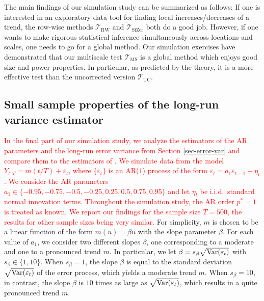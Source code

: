 The main findings of our simulation study can be summarized as follows: If one is interested in an exploratory data tool for finding local increases/decreases of a trend, the row-wise methods $\mathcal{T}_{\text{RW}}$ and $\mathcal{T}_{\text{SiZer}}$ both do a good job. However, if one wants to make rigorous statistical inference simultaneously across locations and scales,
one needs to go for a global method. Our simulation exercises have demonstrated that our multiscale test $\mathcal{T}_{\text{MS}}$ is a global method which enjoys good size and power properties. In particular, as predicted by the theory, it is a more effective test than the uncorrected version $\mathcal{T}_{\text{UC}}$. 


\subsection{Small sample properties of the long-run variance estimator}\label{subsec-sim-lrv}


\textcolor{red}{In the final part of our simulation study, we analyze the estimators of the AR parameters and the long-run error variance from Section \ref{sec-error-var} and compare them to the estimators of \cite{Hall2003}. We simulate data from the model $Y_{t,T} = m(t/T) + \varepsilon_t$, where $\{ \varepsilon_t\}$ is an AR($1$) process of the form $\varepsilon_t = a_1 \varepsilon_{t-1} + \eta_t$. We consider the AR parameters $a_1 \in \{-0.95,-0.75,-0.5,-0.25,0.25,0.5,0.75,0.95\}$ and let $\eta_t$ be i.i.d.\ standard normal innovation terms. Throughout the simulation study, the AR order $p^*=1$ is treated as known. We report our findings for the sample size $T=500$, the results for other sample sizes being very similar.} For simplicity, $m$ is chosen to be a linear function of the form $m(u) = \beta u$ with the slope parameter $\beta$. For each value of $a_1$, we consider two different slopes $\beta$, one corresponding to a moderate and one to a pronounced trend $m$. 
In particular, we let $\beta = s_\beta \sqrt{\textnormal{Var}(\varepsilon_t)}$ with $s_\beta \in \{1,10\}$. When $s_\beta = 1$, the slope $\beta$ is equal to the standard deviation $\sqrt{\textnormal{Var}(\varepsilon_t)}$ of the error process, which yields a moderate trend $m$. When $s_\beta = 10$, in contrast, the slope $\beta$ is $10$ times as large as $\sqrt{\textnormal{Var}(\varepsilon_t)}$, which results in a quite pronounced trend $m$. 


